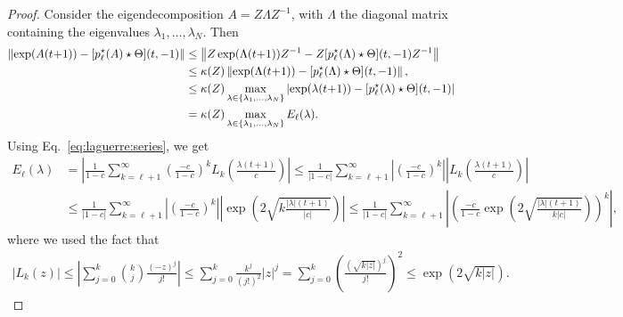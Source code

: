 \documentclass[final,1p,times,number]{elsarticle}
\theoremstyle{plain}%
\begin{document}
\begin{proof}
    Consider the eigendecomposition $A = Z \Lambda Z^{-1}$, with $\Lambda$ the diagonal matrix containing the eigenvalues $\lambda_1, \dots, \lambda_N$. Then
\begin{align*}
   \left \| \exp(A(t\hspace{-2pt}+\hspace{-2pt}1)) -  [p_\ell^\star(A)\star \Theta](t,-1) \right\| &\leq 
    \left\| Z \exp(\Lambda(t\hspace{-2pt}+\hspace{-2pt}1))Z^{-1} -  Z[p_\ell^\star(\Lambda)\star \Theta](t,-1) Z^{-1} \right\| \\
    &\leq  \kappa(Z)
    \left\| \exp(\Lambda(t\hspace{-2pt}+\hspace{-2pt}1))-[p_\ell^\star(\Lambda)\star \Theta](t,-1) \right\|, \\
    &\leq  \kappa(Z) \max_{\lambda \in \{\lambda_1, \dots, \lambda_N\}}
    \left| \exp(\lambda(t\hspace{-2pt}+\hspace{-2pt}1))-[p_\ell^\star(\lambda)\star \Theta](t,-1) \right| \\
    & =  \kappa(Z) \max_{\lambda \in \{\lambda_1, \dots, \lambda_N\}} E_\ell(\lambda).
\end{align*} 
Using Eq.~\eqref{eq:laguerre:series}, we get 
\begin{align*}
    E_\ell(\lambda) 
    &= \left| \frac{1}{1-c} \sum_{k={\ell+1}}^\infty \left(\frac{-c}{1-c}\right)^k L_k\left(\frac{\lambda(t+1)}{c}\right) \right| \leq  \frac{1}{|1-c|} \sum_{k={\ell+1}}^\infty \left| \left(\frac{-c}{1-c}\right)^k \right| \left|L_k\left(\frac{\lambda(t+1)}{c}\right) \right| \\
    &\leq  \frac{1}{|1-c|} \sum_{k={\ell+1}}^\infty \left| \left(\frac{-c}{1-c}\right)^k \right| \left| \exp\left(2 \sqrt{k\frac{|\lambda|(t+1)}{|c|}}\right) \right| \leq  \frac{1}{|1-c|} \sum_{k={\ell+1}}^\infty \left| \left( \frac{-c}{1-c} \exp\left(2\sqrt{\frac{|\lambda|(t+1)}{k|c|}}\right) \right)^k\right|,
\end{align*}
where we used the fact that
\begin{align*}
    \left|L_k(z)\right| \leq \left|\sum_{j=0}^k \binom{k}{j} \frac{(-z)^j}{j!}\right| \leq 
    \sum_{j=0}^k \frac{k^j}{(j!)^2} |z|^j = \sum_{j=0}^k \left( \frac{\left(\sqrt{k|z|}\right)^j}{j!} \right)^2 \leq \exp\left(2\sqrt{k|z|}\right).
\end{align*}

\end{proof}
\end{document}

